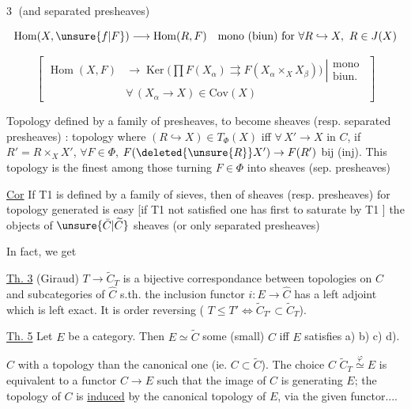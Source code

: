 \textcircled{3} \uline{} (and separated presheaves) 

\[\operatorname{Hom}(X,\unsure{f|F})\longrightarrow\operatorname{Hom}(R,F)\quad\text{mono (biun) for }\forall R\hookrightarrow X,\ R\in J(X)\]

\[\left[\begin{aligned}\operatorname{Hom}(X,F)&\longrightarrow\operatorname{Ker}\bigl(\prod F(X_\alpha)\rightrightarrows F(X_\alpha\times_X X_\beta)\bigr)\ \left|\begin{array}{l}\text{mono}\\\text{biun.}\end{array}\right.\\ &\forall\,(X_\alpha\to X)\in\mathrm{Cov}(X)\end{aligned}\right]\]

Topology defined by a family \inserted{$\Phi$} of presheaves, to become sheaves (resp. separated presheaves) : topology  where $(R\hookrightarrow X)\in T_\Phi(X)$ iff $\forall\,X'\to X$ in $C$, if $R'=R\times_X X'$, $\forall F\in\Phi$, $F(\deleted{\unsure{R}}X')\to F(R')$ bij (inj). This topology is the finest  among those turning  $F\in\Phi$ into sheaves (sep. presheaves)

\uline{Cor} If T1 is defined by a family of sieves, then  of sheaves (resp. presheaves) for topology generated is easy [if T1 not satisfied one has first to saturate by T1 ]
the objects of $\unsure{\bar C|\widetilde C}$  sheaves (or only separated presheaves)

In fact, we get

\uline{Th. 3} (Giraud) $T\longrightarrow\widetilde C_T$ is a bijective correspondance between topologies on $C$ and  subcategories  of $\widehat C$ s.th. the inclusion functor $i\colon E\longrightarrow\widehat C$ has a left adjoint which is left exact. It is order reversing ( $T\leq T'\Longleftrightarrow\widetilde C_{T'}\subset\widetilde C_T$).

\uline{Th. 5} Let $E$ be a category. Then $E\simeq\widetilde C$ some (small) $C$ iff $E$ satisfies a) b) c) d).

   $C$ with a topology   than the canonical one (ie. $C\subset\widetilde C$). The choice   $C$    $\widetilde C_T\overset{\varphi}{\simeq}E$ is equivalent  to a   functor $C\longrightarrow E$ such that the image of $C$ is generating $E$; the topology  of $C$ is \uline{induced} by the canonical topology of $E$, via the given functor....

